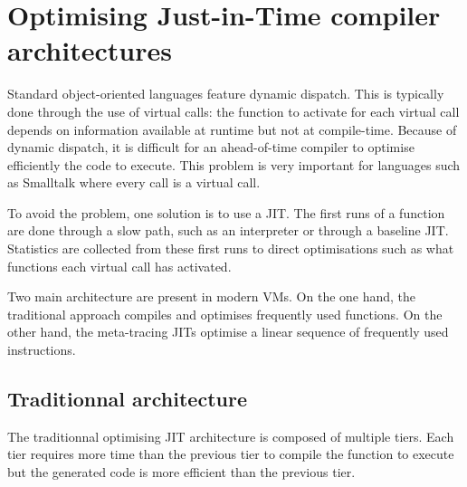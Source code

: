 \documentclass[a4paper,12pt,twoside]{../includes/ThesisStyle}
\begin{document}

\section{Optimising Just-in-Time compiler architectures}

Standard object-oriented languages feature dynamic dispatch. This is typically done through the use of virtual calls: the function to activate for each virtual call depends on information available at runtime but not at compile-time. Because of dynamic dispatch, it is difficult for an ahead-of-time compiler to optimise efficiently the code to execute. This problem is very important for languages such as Smalltalk where every call is a virtual call.

To avoid the problem, one solution is to use a JIT. The first runs of a function are done through a slow path, such as an interpreter or through a baseline JIT. Statistics are collected from these first runs to direct optimisations such as what functions each virtual call has activated. 

Two main architecture are present in modern VMs. On the one hand, the traditional approach compiles and optimises frequently used functions. On the other hand, the meta-tracing JITs optimise a linear sequence of frequently used instructions.

\subsection{Traditionnal architecture}

The traditionnal optimising JIT architecture is composed of multiple tiers. Each tier requires more time than the previous tier to compile the function to execute but the generated code is more efficient than the previous tier. 
\end{document}
